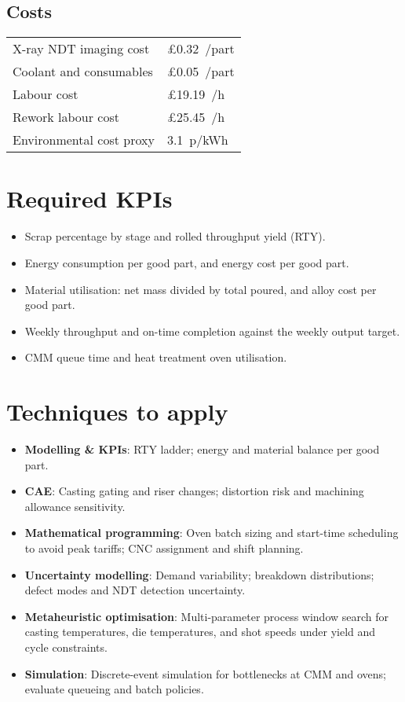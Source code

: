 \documentclass[11pt,a4paper]{article}
\begin{document}
\subsection*{Costs}
\begin{tabular}{@{}ll@{}}
\toprule
X-ray NDT imaging cost & \pounds 0.32~/part \\
Coolant and consumables & \pounds 0.05~/part \\
Labour cost & \pounds 19.19~/h \\
Rework labour cost & \pounds 25.45~/h \\
Environmental cost proxy & 3.1~p/kWh \\
\bottomrule
\end{tabular}

\section*{Required KPIs}
\begin{itemize}
\item Scrap percentage by stage and rolled throughput yield (RTY).
\item Energy consumption per good part, and energy cost per good part.
\item Material utilisation: net mass divided by total poured, and alloy cost per good part.
\item Weekly throughput and on-time completion against the weekly output target.
\item CMM queue time and heat treatment oven utilisation.
\end{itemize}
\section*{Techniques to apply}
\begin{itemize}
\item \textbf{Modelling \& KPIs}: RTY ladder; energy and material balance per good part.
\item \textbf{CAE}: Casting gating and riser changes; distortion risk and machining allowance sensitivity.
\item \textbf{Mathematical programming}: Oven batch sizing and start-time scheduling to avoid peak tariffs; CNC assignment and shift planning.
\item \textbf{Uncertainty modelling}: Demand variability; breakdown distributions; defect modes and NDT detection uncertainty.
\item \textbf{Metaheuristic optimisation}: Multi-parameter process window search for casting temperatures, die temperatures, and shot speeds under yield and cycle constraints.
\item \textbf{Simulation}: Discrete-event simulation for bottlenecks at CMM and ovens; evaluate queueing and batch policies.
\end{itemize}
\end{document}
